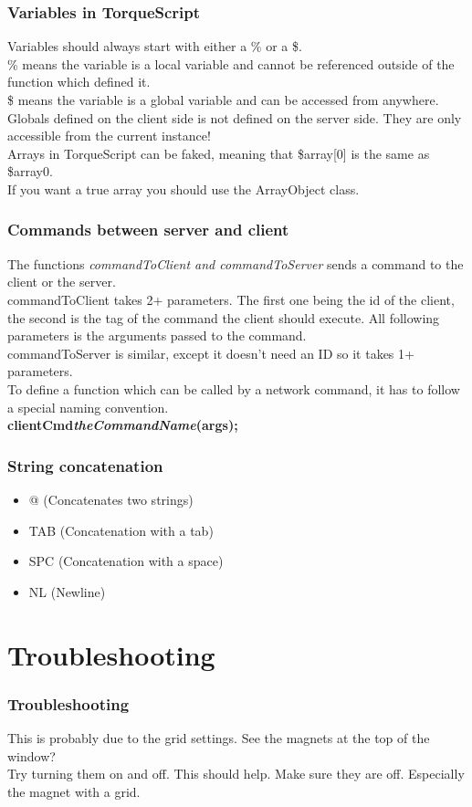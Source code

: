 \begin{frame}
\hypertarget{QG-Variables}{}
\frametitle{Variables in TorqueScript}
Variables should always start with either a \% or a \$.\\
\% means the variable is a local variable and cannot be referenced outside of the function which defined it.\\
\$ means the variable is a global variable and can be accessed from anywhere.\\
Globals defined on the client side is not defined on the server side. They are only accessible from the current instance!\\
Arrays in TorqueScript can be faked, meaning that \$array[0] is the same as \$array0.\\
If you want a true array you should use the ArrayObject class.
\end{frame}

\begin{frame}
\hypertarget{QG-Networking}{}
\frametitle{Commands between server and client}
The functions {\it commandToClient and commandToServer} sends a command to the client or the server.\\
commandToClient takes 2+ parameters. The first one being the id of the client, the second is the tag
of the command the client should execute. All following parameters is the arguments passed to the command.\\
commandToServer is similar, except it doesn't need an ID so it takes 1+ parameters.\\
To define a function which can be called by a network command, it has to follow a special naming convention.\\
{\bf clientCmd{\it theCommandName}(args);}
\end{frame}

\begin{frame}
\hypertarget{QG-Concatenation}{}
\frametitle{String concatenation}
	\begin{itemize}
	\item @ (Concatenates two strings)
	\item TAB (Concatenation with a tab)
	\item SPC (Concatenation with a space)
	\item NL (Newline)
	\end{itemize}
\end{frame}

\section{Troubleshooting}
\begin{frame}
\frametitle{Troubleshooting}
This is probably due to the grid settings. See the magnets at the top of the window?\\
Try turning them on and off. This should help. Make sure they are off. Especially the magnet with a grid.
\end{frame}

